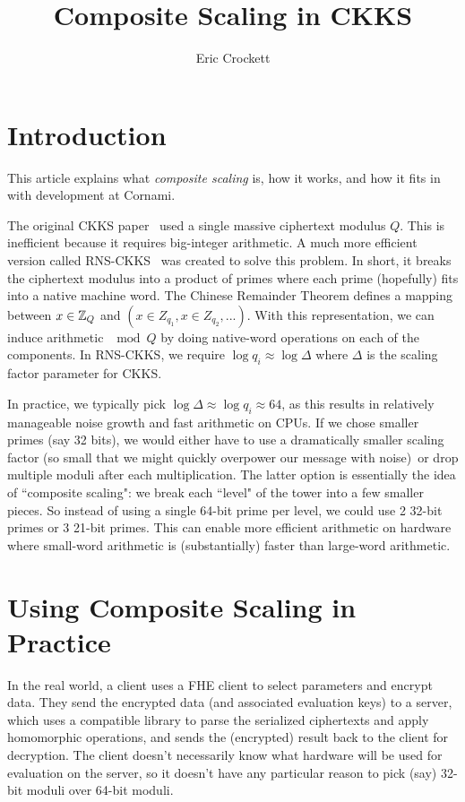 \documentclass{article}
\begin{document}
	\title{Composite Scaling in CKKS}
	\author{Eric Crockett}
	\maketitle
	
	\listoffixmes
	
	\section{Introduction}
	This article explains what \emph{composite scaling} is, how it works, and how it fits in with development at Cornami.
	
	The original CKKS paper~\cite{cryptoeprint:2016/421} used a single massive ciphertext modulus $Q$. This is inefficient because it requires big-integer arithmetic. A much more efficient version called RNS-CKKS~\cite{cryptoeprint:2018/931} was created to solve this problem. In short, it breaks the ciphertext modulus into a product of primes where each prime (hopefully) fits into a native machine word. The Chinese Remainder Theorem defines a mapping between $x\in\mathbb{Z}_Q$ and $(x\in Z_{q_1}, x\in Z_{q_2}, ...)$. With this representation, we can induce arithmetic $\mod Q$ by doing native-word operations on each of the components. In RNS-CKKS, we require $\log{q_i}\approx \log{\Delta}$ where $\Delta$ is the scaling factor parameter for CKKS.
	
	In practice, we typically pick $\log{\Delta} \approx \log{q_i}\approx 64$, as this results in relatively manageable noise growth and fast arithmetic on CPUs. If we chose smaller primes (say 32 bits), we would either have to use a dramatically smaller scaling factor (so small that we might quickly overpower our message with noise) or drop multiple moduli after each multiplication. The latter option is essentially the idea of ``composite scaling": we break each ``level" of the tower into a few smaller pieces. So instead of using a single 64-bit prime per level, we could use 2 32-bit primes or 3 21-bit primes. This can enable more efficient arithmetic on hardware where small-word arithmetic is (substantially) faster than large-word arithmetic.
	

\section{Using Composite Scaling in Practice}
	
	In the real world, a client uses a FHE client to select parameters and encrypt data. They send the encrypted data (and associated evaluation keys) to a server, which uses a compatible library to parse the serialized ciphertexts and apply homomorphic operations, and sends the (encrypted) result back to the client for decryption. The client doesn't necessarily know what hardware will be used for evaluation on the server, so it doesn't have any particular reason to pick (say) 32-bit moduli over 64-bit moduli.
	
\end{document}
